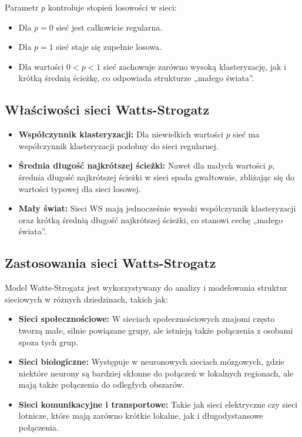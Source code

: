 Parametr $p$ kontroluje stopień losowości w sieci:
\begin{itemize}
    \item Dla $p = 0$ sieć jest całkowicie regularna.
    \item Dla $p = 1$ sieć staje się zupełnie losowa.
    \item Dla wartości $0 < p < 1$ sieć zachowuje zarówno wysoką klasteryzację, jak i krótką średnią ścieżkę, co odpowiada strukturze „małego świata”.
\end{itemize}

\subsection{Właściwości sieci Watts-Strogatz}
\begin{itemize}
    \item \textbf{Współczynnik klasteryzacji:} Dla niewielkich wartości $p$ sieć ma współczynnik klasteryzacji podobny do sieci regularnej.
    \item \textbf{Średnia długość najkrótszej ścieżki:} Nawet dla małych wartości $p$, średnia długość najkrótszej ścieżki w sieci spada gwałtownie, zbliżając się do wartości typowej dla sieci losowej.
    \item \textbf{Mały świat:} Sieci WS mają jednocześnie wysoki współczynnik klasteryzacji oraz krótką średnią długość najkrótszej ścieżki, co stanowi cechę „małego świata”.
\end{itemize}

\subsection{Zastosowania sieci Watts-Strogatz}
Model Watts-Strogatz jest wykorzystywany do analizy i modelowania struktur sieciowych w różnych dziedzinach, takich jak:
\begin{itemize}
    \item \textbf{Sieci społecznościowe:} W sieciach społecznościowych znajomi często tworzą małe, silnie powiązane grupy, ale istnieją także połączenia z osobami spoza tych grup.
    \item \textbf{Sieci biologiczne:} Występuje w neuronowych sieciach mózgowych, gdzie niektóre neurony są bardziej skłonne do połączeń w lokalnych regionach, ale mają także połączenia do odległych obszarów.
    \item \textbf{Sieci komunikacyjne i transportowe:} Takie jak sieci elektryczne czy sieci lotnicze, które mają zarówno krótkie lokalne, jak i długodystansowe połączenia.
\end{itemize}

